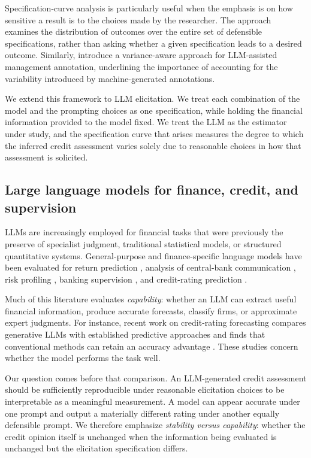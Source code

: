 \documentclass[a4paper,fleqn]{cas-sc}
\begin{document}
Specification-curve analysis is particularly useful when the emphasis is on how sensitive a result is to
the choices made by the researcher. The approach examines the distribution of outcomes over the entire
set of defensible specifications, rather than asking whether a given specification leads to a desired
outcome. Similarly, \citet{camuffo2026variance} introduce a variance-aware approach for
LLM-assisted management annotation, underlining the importance of accounting for the variability
introduced by machine-generated annotations.

We extend this framework to LLM elicitation. We treat each combination of the model and the prompting
choices as one specification, while holding the financial information provided to the model fixed. We
treat the LLM as the estimator under study, and the specification curve that arises
measures the degree to which the inferred credit assessment varies solely due to reasonable choices in
how that assessment is solicited.

\subsection{Large language models for finance, credit, and supervision}
LLMs are increasingly employed for financial tasks that were previously the preserve of specialist
judgment, traditional statistical models, or structured quantitative systems. General-purpose
\citep{brown2020gpt3,ouyang2022instruct,achiam2023gpt4} and finance-specific
\citep{wu2023bloomberggpt,xie2023pixiu} language models have been evaluated for
return prediction \citep{lopezlira2023chatgpt}, analysis of central-bank
communication \citep{hansen2024fedspeak}, risk profiling \citep{hens2025risk}, banking supervision
\citep{garciallorente2026banking}, and credit-rating prediction \citep{drinkall2025forecasting}.

Much of this literature evaluates \emph{capability}: whether an LLM can extract useful financial
information, produce accurate forecasts, classify firms, or approximate expert judgments. For instance,
recent work on credit-rating forecasting compares generative LLMs with established predictive approaches
and finds that conventional methods can retain an accuracy advantage \citep{drinkall2025forecasting}.
These studies concern whether the model performs the task well.

Our question comes before that comparison. An LLM-generated credit assessment should be sufficiently
reproducible under reasonable elicitation choices to be interpretable as a meaningful measurement. A
model can appear accurate under one prompt and output a materially different rating under another equally
defensible prompt. We therefore emphasize \emph{stability versus capability}: whether the credit opinion
itself is unchanged when the information being evaluated is unchanged but the elicitation specification
differs.
\end{document}
